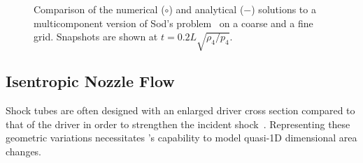 \begin{figure}[!h!]
	\centering
	\caption{\label{FIG_SP} Comparison of the numerical ($\circ$) and analytical ($-$) solutions to a multicomponent version of Sod's problem~\cite{SOD_JCP78,LV_JCP2014} on a coarse and a fine grid. Snapshots are shown at $t=0.2L\sqrt{\rho_4/p_4}$.}
\end{figure}

\subsection{Isentropic Nozzle Flow}
Shock tubes are often designed with an enlarged driver cross section compared to that of the driver in order to strengthen the incident shock~\cite{ALPHER_JFM58}. Representing these geometric variations necessitates \stnshk's capability to model quasi-1D dimensional area changes. 

